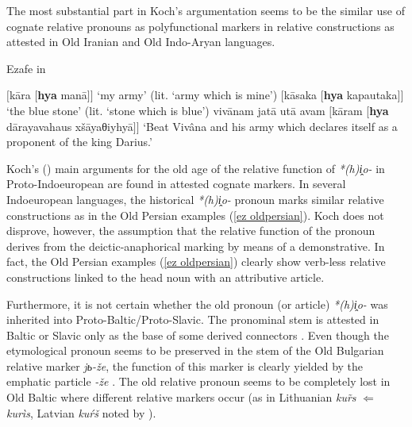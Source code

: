 The most substantial part in Koch's argumentation seems to be the similar use of cognate relative pronouns as polyfunctional markers in relative constructions as attested in Old Iranian and Old Indo-Aryan languages.
\begin{exe} \label{ez oldpersian}
\ex Ezafe in \\
\begin{xlist}
\ex	$[$kāra $[$\textbf{hya} manā$]$$]$
\glt	‘my army’ (lit. ‘army which is mine’)
\ex	$[$kāsaka $[$\textbf{hya} kapautaka$]$$]$
\glt	‘the blue stone’ (lit. ‘stone which is blue’)
\ex	vivānam jatā utā avam $[$kāram [\textbf{hya} dārayavahaus xšāyaθiyhyā$]$$]$
\glt	‘Beat Vivâna and his army which declares itself as a proponent of the king Darius.’
\end{xlist}
\end{exe}
Koch's (\citeyear[53, elsewhere]{koch1992}) main arguments for the old age of the relative function of \textit{*(h)i̭o-} in Proto-Indoeuropean are found in attested cognate markers. In several Indoeuropean languages, the historical \textit{*(h)i̭o-} pronoun marks similar relative constructions as in the Old Persian examples (\ref{ez oldpersian}). Koch does not disprove, however, the assumption that the relative function of the pronoun derives from the deictic-anaphorical marking by means of a demonstrative. In fact, the Old Persian examples (\ref{ez oldpersian}) clearly show verb-less relative constructions linked to the head noun with an attributive article.

Furthermore, it is not certain whether the old pronoun (or article) \textit{*(h)i̭o-} was inherited into Proto-Baltic/Proto-Slavic. The pronominal stem is attested in Baltic or Slavic only as the base of some derived connectors \cite[56]{heinrichs1954}. Even though the etymological pronoun seems to be preserved in the stem of the Old Bulgarian relative marker \textit{jь-že}, the function of this marker is clearly yielded by the emphatic particle \textit{-že} \cite[56]{heinrichs1954}.  %
  The old relative pronoun seems to be completely lost in Old Baltic where different relative markers occur (as in Lithuanian \textit{ku\~rs} $\Leftarrow$ \textit{kurìs}, Latvian \textit{kuŕš} noted by \citealt[15]{schmidt1959}).

